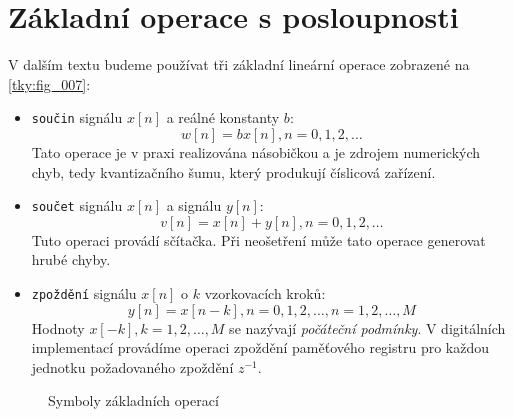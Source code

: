   \section{Základní operace s posloupnosti}
    V dalším textu budeme používat tři základní lineární operace zobrazené na \ref{tky:fig_007}:
    \begin{itemize}
      \item \texttt{součin} signálu $x[n]$ a reálné konstanty $b$:
            $$w[n]=bx[n], n = 0,1,2, \ldots$$ Tato operace je v praxi realizována násobičkou a je
            zdrojem numerických chyb, tedy kvantizačního šumu, který produkují číslicová zařízení.
      \item \texttt{součet} signálu $x[n]$ a signálu $y[n]$:
            $$v[n]=x[n]+y[n], n = 0,1,2, \ldots$$ Tuto operaci provádí sčítačka. Při neošetření může
            tato operace generovat hrubé chyby.
      \item \texttt{zpoždění} signálu $x[n]$ o $k$ vzorkovacích kroků:  
            $$y[n]=x[n-k], n = 0,1,2, \ldots, n = 1,2, \ldots, M $$  Hodnoty $x[-k], k = 1, 2,
            \ldots, M$ se nazývají \emph{počáteční podmínky}. V digitálních implementací provádíme
            operaci zpoždění paměťového registru pro každou jednotku požadovaného zpoždění $z^{-1}$.
    \end{itemize}

    \begin{figure}[ht!]
      \centering
        \newline
      \caption[Základní operace]{Symboly základních operací \cite[s.~7]{Sovka2002}} 
      \label{ces:fig048}
    \end{figure}